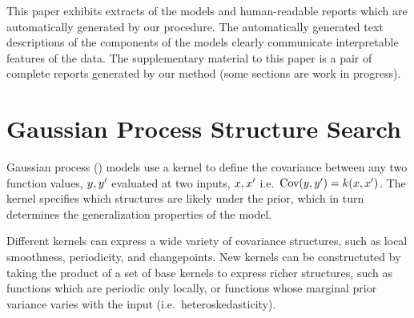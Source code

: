 \documentclass{article} %
\def\ie{i.e.\ }
\begin{document}
This paper exhibits extracts of the models and human-readable reports which are automatically generated by our procedure.
The automatically generated text descriptions of the components of the models clearly communicate interpretable features of the data.
The supplementary material to this paper is a pair of complete reports generated by our method (some sections are work in progress).



\section{Gaussian Process Structure Search}
\label{sec:gpss}

Gaussian process (\gp{}) models \cite{rasmussen38gaussian} use a kernel to define the covariance between any two function values, $y, y'$ evaluated at two inputs, $x,x'$ \ie ${\textrm{Cov}(y, y') = k(x,x')}$.
The kernel specifies which structures are likely under the \gp{} prior, which in turn determines the generalization properties of the model.

Different kernels can express a wide variety of covariance structures, such as local smoothness, periodicity, and changepoints.
New kernels can be constructuted by taking the product of a set of base kernels to express richer structures, such as functions which are periodic only locally, or functions whose marginal prior variance varies with the input (\ie heteroskedasticity).
\end{document}
